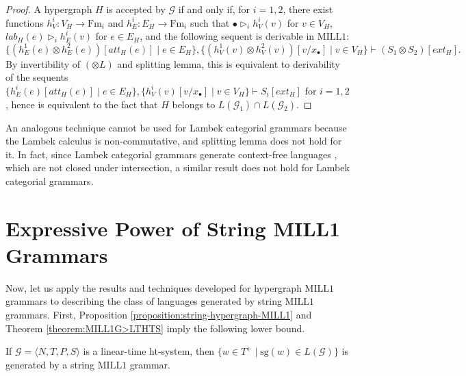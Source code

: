 \documentclass[a4paper,UKenglish,cleveref, autoref, thm-restate,pdfa]{lipics-v2021}
\newcommand{\Gram}{\mathcal{G}}
\newcommand{\lab}{\mathit{lab}}
\newcommand{\att}{\mathit{att}}
\newcommand{\ext}{\mathit{ext}}
\newcommand{\SG}{\mathrm{sg}}
\newcommand{\Fm}{\mathrm{Fm}}
\newcommand{\mconj}{\otimes}
\newcommand{\MILLFO}{\mathrm{MILL}1}
\begin{document}
\begin{proof}
	A hypergraph $H$ is accepted by $\Gram$ if and only if, for $i=1,2$, there exist functions $h^i_V:V_H \to \Fm_i$ and $h^i_E:E_H \to \Fm_i$ such that $\bullet \triangleright_i h^i_V(v)$ for $v \in V_H$, $\lab_H(e) \triangleright_i h^i_E(v)$ for $e \in E_H$, and the following sequent is derivable in $\MILLFO$:
	$$
	\{(h_E^1(e)\mconj h_E^2(e))[\att_H(e)] \mid e \in E_H\},
	\{(h_V^1(v)\mconj h_V^2(v))[v/x_\bullet] \mid v \in V_H\}
	\vdash
	(S_1 \mconj S_2)[\ext_H].
	$$
	By invertibility of $(\mconj L)$ and splitting lemma, this is equivalent to derivability of the sequents $\{h_E^i(e)[\att_H(e)] \mid e \in E_H\},
	\{h_V^i(v)[v/x_\bullet] \mid v \in V_H\}
	\vdash
	S_i[\ext_H]$ for $i=1,2$, hence is equivalent to the fact that $H$ belongs to $L(\Gram_1) \cap L(\Gram_2)$.
\end{proof}
An analogous technique cannot be used for Lambek categorial grammars because the Lambek calculus is non-commutative, and splitting lemma does not hold for it. In fact, since Lambek categorial grammars generate context-free languages \cite{Pentus93}, which are not closed under intersection, a similar result does not hold for Lambek categorial grammars.

\section{Expressive Power of String MILL1 Grammars}\label{section:MILL1-grammars}

Now, let us apply the results and techniques developed for hypergraph $\MILLFO$ grammars to describing the class of languages generated by string $\MILLFO$ grammars. First, Proposition \ref{proposition:string-hypergraph-MILL1} and Theorem \ref{theorem:MILL1G>LTHTS} imply the following lower bound.
\begin{corollary}\label{corollary:string-MILL1-grammars}
	If $\Gram = \langle N, T, P, S \rangle$ is a linear-time ht-system, then $\{w \in T^+ \mid \SG(w) \in L(\Gram)\}$ is generated by a string $\MILLFO$ grammar.
\end{corollary}
\end{document}
